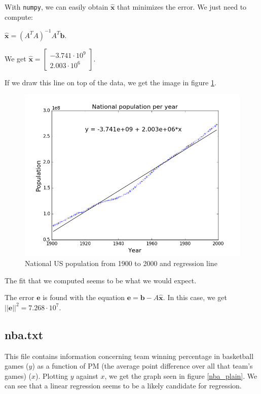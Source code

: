 \documentclass[]{article}
\begin{document}
With \texttt{numpy}, we can easily obtain $\widehat{\textbf{x}}$ that minimizes the error. We just need to compute:

$\widehat{\textbf{x}} = (A^TA)^{-1}A^T\textbf{b}$.

We get $\widehat{\textbf{x}} = \left[\begin{smallmatrix}-3.741 \cdot 10^9\\2.003 \cdot 10^6\end{smallmatrix}\right]$.

If we draw this line on top of the data, we get the image in figure \ref{pop_reg}.

\begin{figure}[h]
\centering
\includegraphics{pop_reg.png}
\caption{National US population from 1900 to 2000 and regression line}
\label{pop_reg}
\end{figure}

The fit that we computed seems to be what we would expect.

The error $\textbf{e}$ is found with the equation $\textbf{e} = \textbf{b} - A\widehat{\textbf{x}}$. In this case, we get $||\textbf{e}||^2 = 7.268 \cdot 10^7$.

\newpage
\subsection*{nba.txt}
This file contains information concerning team winning percentage in basketball games ($y$) as a function of PM (the average point difference over all that team's games) ($x$). Plotting $y$ against $x$, we get the graph seen in figure \ref{nba_plain}. We can see that a linear regression seems to be a likely candidate for regression.
\end{document}
